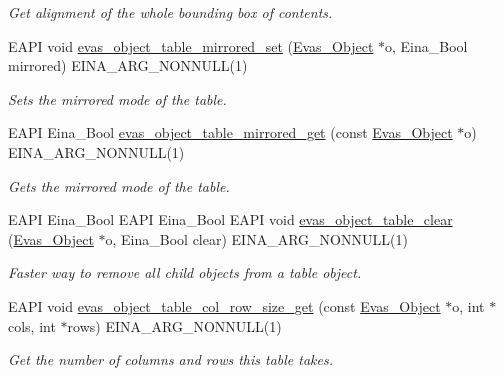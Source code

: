 \begin{DoxyCompactItemize}
\begin{DoxyCompactList}\small\item\em Get alignment of the whole bounding box of contents. \item\end{DoxyCompactList}\item 
EAPI void \hyperlink{group__Evas__Object__Table_ga8f775fb97bf5da5e8a0005a89027044b}{evas\_\-object\_\-table\_\-mirrored\_\-set} (\hyperlink{group__Evas__Object__Group_ga9e19e6dd1f517a0ba437c0114d3e7c97}{Evas\_\-Object} $\ast$o, Eina\_\-Bool mirrored) EINA\_\-ARG\_\-NONNULL(1)
\begin{DoxyCompactList}\small\item\em Sets the mirrored mode of the table. \item\end{DoxyCompactList}\item 
EAPI Eina\_\-Bool \hyperlink{group__Evas__Object__Table_gac008b924a1ba3b0133d0ac11b3e6af06}{evas\_\-object\_\-table\_\-mirrored\_\-get} (const \hyperlink{group__Evas__Object__Group_ga9e19e6dd1f517a0ba437c0114d3e7c97}{Evas\_\-Object} $\ast$o) EINA\_\-ARG\_\-NONNULL(1)
\begin{DoxyCompactList}\small\item\em Gets the mirrored mode of the table. \item\end{DoxyCompactList}\item 
EAPI Eina\_\-Bool EAPI Eina\_\-Bool EAPI void \hyperlink{group__Evas__Object__Table_gaec5a10416b76102f7e22c7b799bfac04}{evas\_\-object\_\-table\_\-clear} (\hyperlink{group__Evas__Object__Group_ga9e19e6dd1f517a0ba437c0114d3e7c97}{Evas\_\-Object} $\ast$o, Eina\_\-Bool clear) EINA\_\-ARG\_\-NONNULL(1)
\begin{DoxyCompactList}\small\item\em Faster way to remove all child objects from a table object. \item\end{DoxyCompactList}\item 
EAPI void \hyperlink{group__Evas__Object__Table_ga007c88dba9eb3b326aa67a10c143f3a9}{evas\_\-object\_\-table\_\-col\_\-row\_\-size\_\-get} (const \hyperlink{group__Evas__Object__Group_ga9e19e6dd1f517a0ba437c0114d3e7c97}{Evas\_\-Object} $\ast$o, int $\ast$cols, int $\ast$rows) EINA\_\-ARG\_\-NONNULL(1)
\begin{DoxyCompactList}\small\item\em Get the number of columns and rows this table takes. \item\end{DoxyCompactList}\item 

\end{DoxyCompactItemize}
